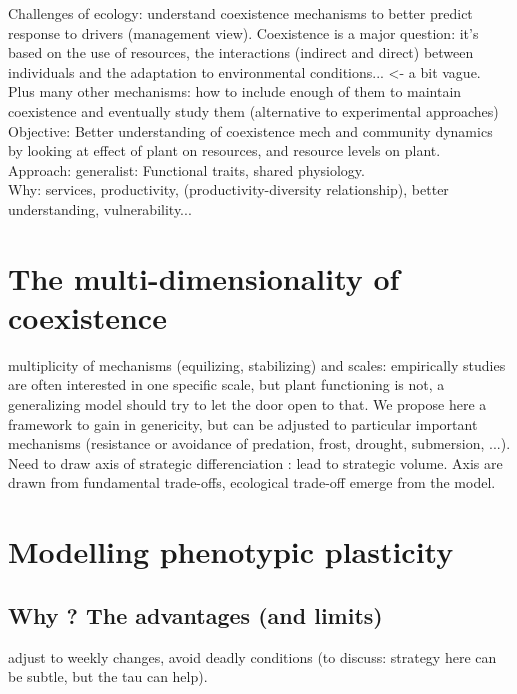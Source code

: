 \documentclass[review]{elsarticle}
\begin{document}
Challenges of ecology: understand coexistence mechanisms to better predict response to drivers (management view). Coexistence is a major question: it's based on the use of resources, the interactions (indirect and direct) between individuals and the adaptation to environmental conditions... <- a bit vague. Plus many other mechanisms: how to include enough of them to maintain coexistence and eventually study them (alternative to experimental approaches)\\
Objective: Better understanding of coexistence mech and community dynamics by looking at effect of plant on resources, and resource levels on plant.\\
Approach: generalist: Functional traits, shared physiology.\\
Why: services, productivity, (productivity-diversity relationship), better understanding, vulnerability...


\section{The multi-dimensionality of coexistence}
multiplicity of mechanisms (equilizing, stabilizing) and scales: empirically studies are often interested in one specific scale, but plant functioning is not, a generalizing model should try to let the door open to that. We propose here a framework to gain in genericity, but can be adjusted to particular important mechanisms (resistance or avoidance of predation, frost, drought, submersion, ...).\\
Need to draw axis of strategic differenciation : lead to strategic volume. Axis are drawn from fundamental trade-offs, ecological trade-off emerge from the model.


\section{Modelling phenotypic plasticity}
\subsection{Why ? The advantages (and limits)}
adjust to weekly changes, avoid deadly conditions (to discuss: strategy here can be subtle, but the tau can help).
\end{document}
